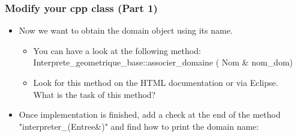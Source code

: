 \documentclass[10pt, hyperref={unicode=true,pdfusetitle, bookmarks=true,bookmarksnumbered=false,bookmarksopen=false, breaklinks=false,pdfborder={0 0 1},backref=true,colorlinks=true,linkcolor=darkblue,pageanchor, urlcolor=darkblue}]{beamer}
\begin{document}
\begin{frame}
\frametitle{Modify your cpp class (Part 1)}
\begin{block}{}

\begin{itemize}




\item Now we want to obtain the domain object using its name. 
\begin{itemize}
\item You can have a look at the following method: \\
Interprete\_geometrique\_base::associer\_domaine ( Nom \& nom\_dom)
\item Look for this method on the HTML documentation or via Eclipse.\\
 What is the task of this method? 
\end{itemize}



\item Once implementation is finished, add a check at the end of the method
"interpreter\_(Entree\&)" and find how to print the domain name:
\begin{center}
\end{center}
\end{itemize}

\end{block}
\end{frame}
\end{document}
